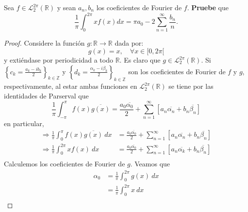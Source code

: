 \documentclass[12pt]{report}
\theoremstyle{largebreak}
\newcommand\cf[3]{\ensuremath{#1:#2\rightarrow#3}}
\begin{document}
    \begin{excer}
        Sea $f\in\mathcal{L}_2^{2\pi}(\mathbb{R})$ y sean $a_n,b_n$ los coeficientes de Fourier de $f$. \textbf{Pruebe} que
        \begin{equation*}
            \frac{1}{\pi}\int_0^{2\pi}xf(x)dx=\pi a_0-2\sum_{ n=1}^\infty \frac{b_n}{n}.
        \end{equation*}
    \end{excer}

    \begin{proof}
        Considere la función $\cf{g}{\mathbb{R}}{\mathbb{R}}$ dada por:
        \begin{equation*}
            g(x)=x,\quad\forall x\in[0,2\pi[
        \end{equation*}
        y extiéndase por periodicidad a todo $\mathbb{R}$. Es claro que $g\in\mathcal{L}_2^{2\pi}(\mathbb{R})$. Si $\left\{c_k=\frac{a_k-ib_k}{2}\right\}_{ k\in\mathbb{Z}}$ y $\left\{d_k=\frac{\alpha_k-i\beta_k}{2}\right\}_{ k\in\mathbb{Z}}$ son los coeficientes de Fourier de $f$ y $g$, respectivamente, al estar ambas funciones en $\mathcal{L}_2^{2\pi}(\mathbb{R})$ se tiene por las identidades de Parserval que
        \begin{equation*}
            \frac{1}{\pi}\int_{-\pi}^{\pi}f(x)\overline{g(x)}=\frac{a_0\overline{\alpha_0}}{2}+\sum_{n=1}^\infty\left[a_n\overline{\alpha_n}+b_n\overline{\beta_n}\right]
        \end{equation*}
        en particular,
        \begin{equation*}
            \begin{split}
                \Rightarrow\frac{1}{\pi}\int_{0}^{\pi}f(x)\overline{g(x)}\:dx&=\frac{a_0\overline{\alpha_0}}{2}+\sum_{n=1}^\infty\left[a_n\overline{\alpha_n}+b_n\overline{\beta_n}\right]\\
                \Rightarrow \frac{1}{\pi}\int_{0}^{2\pi}xf(x)\:dx&=\frac{a_0\overline{\alpha_0}}{2}+\sum_{n=1}^\infty\left[a_n\overline{\alpha_k}+b_n\overline{\beta_n}\right]\\
            \end{split}
        \end{equation*}
        Calculemos los coeficientes de Fourier de $g$. Veamos que
        \begin{equation*}
            \begin{split}
                \alpha_0&=\frac{1}{\pi}\int_{0}^{2\pi}g(x)\:dx\\
                &=\frac{1}{\pi}\int_{0}^{2\pi}x\:dx\\

\end{split}
\end{equation*}
\end{proof}
\end{document}
